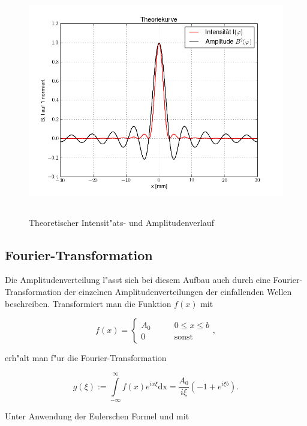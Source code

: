 		\begin{figure}[h]
			\centering
			\includegraphics[height = 10cm]{theorie_1.png}
			\caption{Theoretischer Intensit"ats- und Amplitudenverlauf}
		\end{figure}

	\subsection{Fourier-Transformation}
		\label{subsec:fourier}

		Die Amplitudenverteilung l"asst sich bei diesem Aufbau auch durch eine 
		Four\-ier-Trans\-for\-ma\-tion der einzelnen Amplitudenverteilungen der einfallenden Wellen beschreiben.
		Transformiert man die Funktion $f(x)$ mit

		\begin{equation}
			f(x) = \left\{
			\begin{array}{ll}
			 	 A_0 & \qquad 0 \leq x \leq b \\
			 	 0 & \qquad \mathrm{sonst} 
			 \end{array} ,
			 \right.
		\end{equation}

		erh"alt man f"ur die Fourier-Transformation

		\begin{equation}
			g(\xi) := \int \limits_{-\infty}^{\infty} f(x) e^{ix \xi} \mathrm{dx} =
			\frac{A_0}{i \xi} \left(-1 + e^{i \xi b}\right) .
			\label{amplitude_fourier}
		\end{equation}

		Unter Anwendung der Eulerschen Formel und mit

